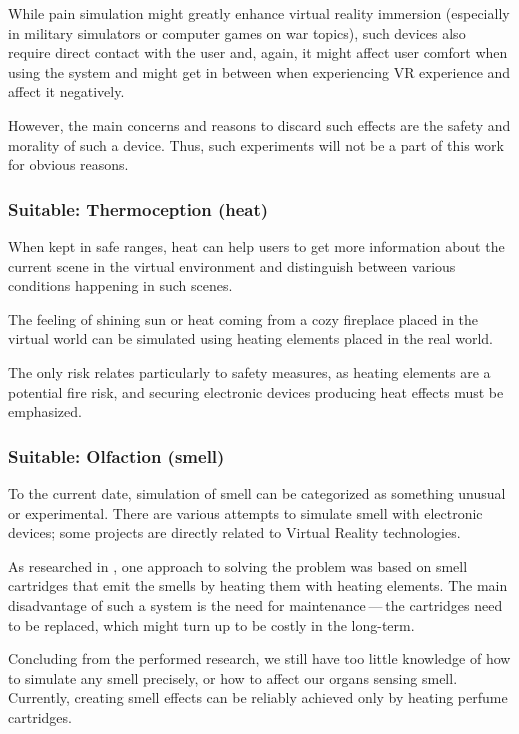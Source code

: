 While pain simulation might greatly enhance virtual reality immersion
(especially in military simulators or computer games on war topics),
such devices also require direct contact with the user and, again,
it might affect user comfort when using the system and might get in between
when experiencing VR experience and affect it negatively.


However, the main concerns and reasons to discard such effects are the
safety and morality of such a device. Thus, such experiments will not be
a part of this work for obvious reasons.


\hypertarget{x-suitable:-thermoception-(heat)}{\subsubsection*{Suitable: Thermoception (heat)}}
When kept in safe ranges, heat can help users to get more information about the
current scene in the virtual environment and distinguish between various conditions
happening in such scenes.


The feeling of shining sun or heat coming from a cozy fireplace placed in the
virtual world can be simulated using heating elements placed in the real world.


The only risk relates particularly to safety measures, as heating elements are
a potential fire risk, and securing electronic devices producing heat effects
must be emphasized.


\hypertarget{x-suitable:-olfaction-(smell)}{\subsubsection*{Suitable: Olfaction (smell)}}
To the current date, simulation of smell can be categorized as something unusual
or experimental. There are various attempts to simulate smell with electronic
devices; some projects are directly related to Virtual Reality technologies.


As researched in
\hyperlink{./03-current-state-of-effects#feelreal}{},
one approach to solving the problem was based on smell
cartridges that emit the smells by heating them with heating elements.
The main disadvantage of such a system is the need for maintenance — the
cartridges need to be replaced, which might turn up to be costly in the
long-term.


Concluding from the performed research, we still have too little
knowledge of how to simulate any smell precisely, or how to affect our organs
sensing smell. Currently, creating smell effects can be reliably achieved
only by heating perfume cartridges.


